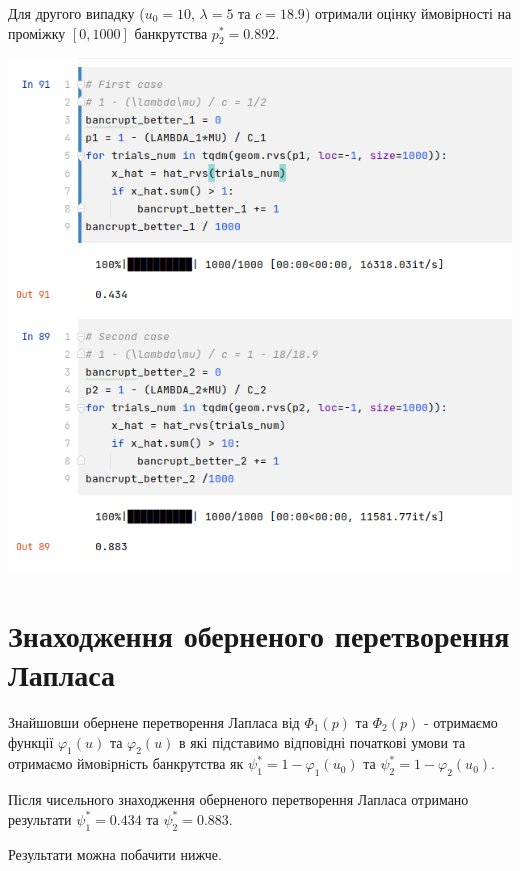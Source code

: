 \documentclass{article}
\begin{document}
    Для другого випадку ($u_0 = 10$, $\lambda = 5$ та $c = 18.9$) 
    отримали оцінку ймовірності на проміжку $[0, 1000]$
    банкрутства $p^*_2 =  0.892$.


    \includegraphics[scale=0.5]{img/2021-10-11-18-56-31.png}

    \section{Знаходження оберненого перетворення Лапласа}

    Знайшовши обернене перетворення Лапласа від $\Phi_1(p)$ та $\Phi_2(p)$ 
    - отримаємо функції $\varphi_1(u)$ та $\varphi_2(u)$ в які підставимо відповідні початкові умови та 
    отримаємо ймовiрнiсть банкрутства як $\psi^*_1 = 1 - \varphi_1(u_0)$ та $\psi^*_2 = 1 - \varphi_2(u_0)$.

    Після чисельного знаходження оберненого перетворення Лапласа отримано результати 
    $\psi^*_1 = 0.434$ та $\psi^*_2 = 0.883$.

    Результати можна побачити нижче.
\end{document}
